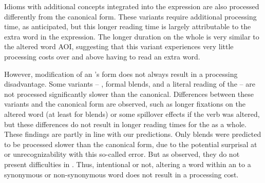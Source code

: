 \documentclass[output=paper
,modfonts
,nonflat]{langsci/langscibook}
\begin{document}
Idioms  with additional concepts integrated  into the expression are also processed differently from the canonical form. These variants require additional processing  time, as anticipated, but this longer reading time is largely attributable to the extra word in the expression. The longer duration on the whole  is very similar to the altered word AOI, suggesting that this variant experiences very little processing costs over and above having to read an extra word.
 
However, modification of an 's form does not always result in a processing disadvantage. Some variants -- , formal   blends, and a literal  reading of the  -- are not processed significantly slower than the canonical. Differences between these variants and the canonical form are observed, such as longer fixations on the altered word (at least for  blends) or some spillover effects if the verb was altered, but these differences do not result in longer reading times for the  as a whole. These findings are partly in line with our predictions. Only  blends were predicted to be processed slower than the canonical form, due to the potential surprisal at or unrecognizability with this so-called error. But as observed, they do not present difficulties in . Thus, intentional or not, altering a word within an  to a synonymous or non-synonymous word does not result in a processing cost.
\end{document}
